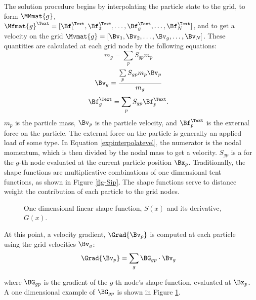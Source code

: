 The solution procedure begins by interpolating the particle state to the
grid, to form $\MMmat{g}$, \\ 
$\Mfmat{g}^\Text = [\Bf_1^\Text, \Bf_2^\Text, \dots, \Bf_g^\Text, \dots, \Bf_N^\Text]$,
and to get a velocity 
on the grid $\Mvmat{g} = [\Bv_1, \Bv_2, \dots, \Bv_g, \dots, \Bv_N]$.  
These quantities are calculated at each grid node by the following equations:
\begin{equation}\label{expinterpolatemass}
  m_g = \sum_{p} S_{gp} m_p  
\end{equation}
\begin{equation}\label{expinterpolatevel}
  \Bv_g = \frac{\sum\limits_{p} S_{gp} m_p \Bv_p}{m_g}
\end{equation}
\begin{equation}
  \Bf^\Text_g = \sum_{p} S_{gp} \Bf^\Text_p. 
\label{expinterpolateFext}
\end{equation}
$m_p$ is the particle mass, $\Bv_p$ is the particle velocity, and 
$\Bf_p^\Text$ is the external force on the particle.  The external force on 
the particle is generally an applied load of some type.  In Equation 
\ref{expinterpolatevel}, the numerator is the nodal momentum, 
which is then divided by the nodal mass to get a velocity.  
$S_{gp}$ is a  for the $g$-th node
evaluated at the current particle position $\Bx_p$.  Traditionally, the 
shape functions are multiplicative combinations of one dimensional tent 
functions, as shown in Figure \ref{fig-Sip}.  The shape functions serve 
to distance weight the contribution of each particle to the grid nodes.  

\begin{figure}[htbp!]
  \centering
   \hspace{24pt}
  \caption{\label{fig-Sip} One dimensional linear shape function, 
           $S(x)$ and its derivative, $G(x)$.}
  \label{fig-Gip}
\end{figure}

At this point, a velocity gradient, $\Grad{\Bv_p}$ is 
computed at each particle using the grid velocities $\Bv_g$:
\begin{equation}
  \Grad{\Bv_p} = \sum_g \BG_{gp}\cdot\Bv_g
 \label{velgrad}
\end{equation}

\noindent
where $\BG_{gp}$ is the gradient of the $g$-th node's shape 
function, evaluated at $\Bx_p$.  A one dimensional example of 
$\BG_{gp}$ is shown in Figure \ref{fig-Gip}.  

